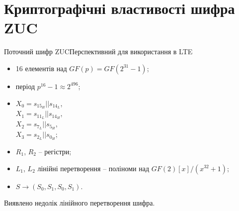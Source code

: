 \documentclass[10pt, ucs, handout]{beamer}
\begin{document}
\section{Криптографічні властивості шифра ZUC}
\begin{frame}{Поточний шифр ZUC}{Перспективний для використання в LTE}
    \begin{minipage}{0.4 \textwidth}
        \begin{itemize}
            \item 16 елементів над {\small $GF(p) = GF(2^{31}-1)$};
            \item період $p^{16} -1 \approx 2^{496}$;
            \item $X_0 = s_{15_H} || s_{14_L}$,  \\ 
                $X_1 = s_{11_L} || s_{14_H}$, \\ 
                $X_2 = s_{7_L} || s_{5_H}$, \\ 
                $X_3 = s_{2_L} || s_{0_H}$;
            \item $R_1$, $R_2$ -- регістри;
            \item $L_1$, $L_2$ лінійні перетворення --
                поліноми над $GF(2)[x]/(x^{32}+1)$;
            \item $S \rightarrow (S_0, S_1, S_0, S_1)$.
        \end{itemize}
        \begin{block}{}
            Виявлено недолік лінійного перетворення шифра.
        \end{block}
    \end{minipage}%
        \hspace*{1.6ex}%
    \begin{minipage}{0.6 \textwidth}
        
    \end{minipage}
\end{frame}
\end{document}
